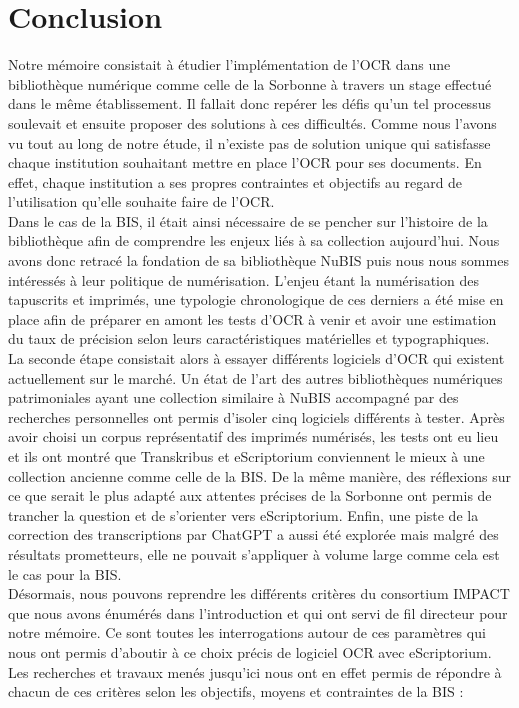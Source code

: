 \documentclass[a4paper,12pt,twoside]{book}
\begin{document}
	
	\chapter*{Conclusion}
	
Notre mémoire consistait à étudier l'implémentation de l'OCR dans une
bibliothèque numérique comme celle de la Sorbonne à travers un stage
effectué dans le même établissement. Il fallait donc repérer les défis
qu'un tel processus soulevait et ensuite proposer des solutions à ces
difficultés. Comme nous l'avons vu tout au long de notre étude, il
n'existe pas de solution unique qui satisfasse chaque institution
souhaitant mettre en place l'OCR pour ses documents. En effet, chaque
institution a ses propres contraintes et objectifs au regard de
l'utilisation qu'elle souhaite faire de l'OCR. \\

Dans le cas de la BIS, il était ainsi nécessaire de se pencher sur
l'histoire de la bibliothèque afin de comprendre les enjeux liés à sa
collection aujourd'hui. Nous avons donc retracé la fondation de sa
bibliothèque NuBIS puis nous nous sommes intéressés à leur politique de
numérisation. L'enjeu étant la numérisation des tapuscrits et imprimés,
une typologie chronologique de ces derniers a été mise en place afin de
préparer en amont les tests d'OCR à venir et avoir une estimation du
taux de précision selon leurs caractéristiques matérielles et
typographiques.\\

La seconde étape consistait alors à essayer différents logiciels d'OCR
qui existent actuellement sur le marché. Un état de l'art des autres
bibliothèques numériques patrimoniales ayant une collection similaire à NuBIS
accompagné par des recherches personnelles ont permis d'isoler cinq
logiciels différents à tester. Après avoir choisi un corpus
représentatif des imprimés numérisés, les tests ont eu lieu et ils ont
montré que Transkribus et eScriptorium conviennent le mieux à une
collection ancienne comme celle de la BIS. De la même manière, des
réflexions sur ce que serait le plus adapté aux attentes précises de la
Sorbonne ont permis de trancher la question et de s'orienter vers
eScriptorium. Enfin, une piste de la correction des transcriptions par
ChatGPT a aussi été explorée mais malgré des résultats prometteurs, elle ne pouvait s'appliquer à volume large comme cela est le cas pour la BIS. \\

Désormais, nous pouvons reprendre les différents critères du consortium IMPACT que nous avons énumérés dans l'introduction et qui ont servi de fil directeur pour notre mémoire. Ce sont toutes les interrogations autour de ces paramètres qui nous ont permis d'aboutir à ce choix précis de logiciel OCR avec eScriptorium. Les recherches et travaux menés jusqu'ici nous ont en effet permis de répondre à chacun de ces critères selon les objectifs, moyens et contraintes de la BIS : \\
\end{document}
